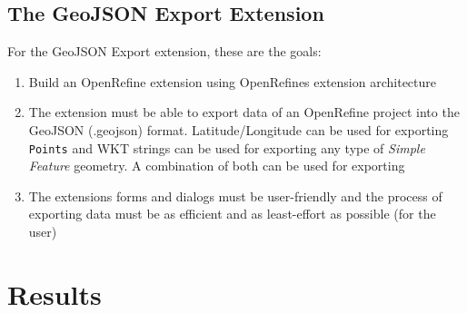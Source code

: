 \subsection*{The GeoJSON Export Extension}
For the GeoJSON Export extension, these are the goals:
\begin{enumerate}
    \item Build an OpenRefine extension using OpenRefine\textquotesingle s extension architecture
    \item The extension must be able to export data of an OpenRefine project into the GeoJSON (.geojson) format. Latitude/Longitude
    can be used for exporting \texttt{Points} and WKT strings can be used for exporting any type of \textit{Simple Feature} geometry.
    A combination of both can be used for exporting
    \item The extension\textquotesingle s forms and dialogs must be user-friendly and the process of exporting data must be as efficient
    and as least-effort as possible (for the user)
\end{enumerate}
\section*{Results}
